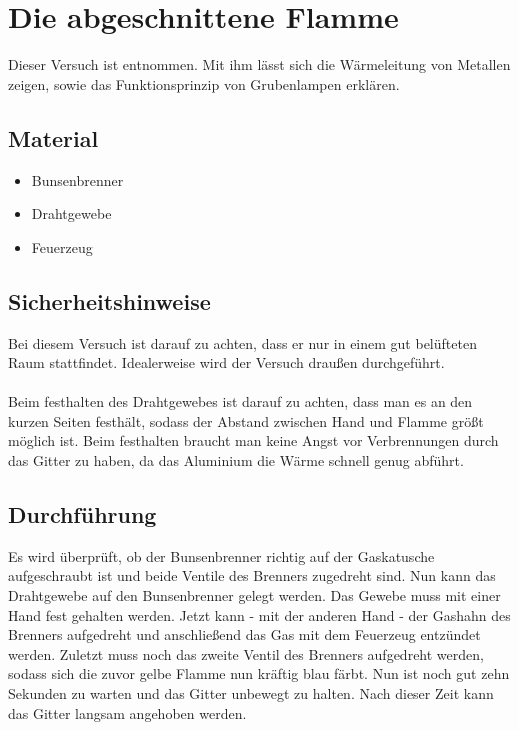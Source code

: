 \section{Die abgeschnittene Flamme}

Dieser Versuch ist \cite{Physikanten} entnommen.
Mit ihm lässt sich die Wärmeleitung von Metallen zeigen, sowie das Funktionsprinzip von Grubenlampen erklären.

\subsection{Material}

\begin{itemize}
	\item Bunsenbrenner
	\item Drahtgewebe
	\item Feuerzeug
\end{itemize}

\subsection{Sicherheitshinweise}

Bei diesem Versuch ist darauf zu achten, dass er nur in einem gut belüfteten Raum stattfindet.
Idealerweise wird der Versuch draußen durchgeführt.\\
\\
Beim festhalten des Drahtgewebes ist darauf zu achten, dass man es an den kurzen Seiten festhält, sodass der Abstand zwischen Hand und Flamme größt möglich ist.
Beim festhalten braucht man keine Angst vor Verbrennungen durch das Gitter zu haben, da das Aluminium die Wärme schnell genug abführt.

\subsection{Durchführung}

Es wird überprüft, ob der Bunsenbrenner richtig auf der Gaskatusche aufgeschraubt ist und beide Ventile des Brenners zugedreht sind.
Nun kann das Drahtgewebe auf den Bunsenbrenner gelegt werden.
Das Gewebe muss mit einer Hand fest gehalten werden.
Jetzt kann - mit der anderen Hand - der Gashahn des Brenners aufgedreht und anschließend das Gas mit dem Feuerzeug entzündet werden.
Zuletzt muss noch das zweite Ventil des Brenners aufgedreht werden, sodass sich die zuvor gelbe Flamme nun kräftig blau färbt.
Nun ist noch gut zehn Sekunden zu warten und das Gitter unbewegt zu halten.
Nach dieser Zeit kann das Gitter langsam angehoben werden.

